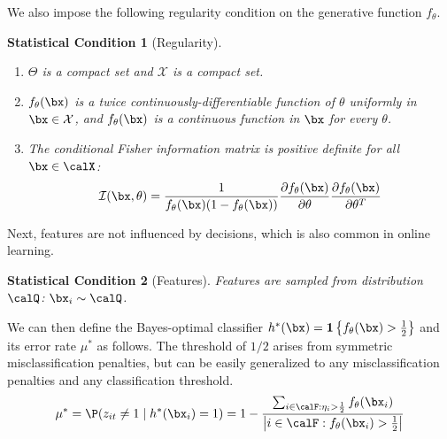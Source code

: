\documentclass[11pt]{article}
\newtheorem{stat}{Statistical Condition}[]
\begin{document}
We also impose the following regularity condition on the generative function $f_\theta$.
\begin{stat}[Regularity]\label{ass:regularity_R1}
\begin{enumerate}
    \item $\Theta$ is a compact set and $\mathcal{X}$ is a compact set.
    \item $f_\theta(\bx)$ is a twice continuously-differentiable function of $\theta$ uniformly in $\bx \in \mathcal{X}$, and $f_\theta(\bx)$ is a continuous function in $\bx$ for every $\theta$. 
    \item The conditional Fisher information matrix is positive definite for all $\bx\in\calX$:
    \[\mathcal{I}(\bx,\theta) = \frac{1}{f_\theta(\bx)(1-f_\theta(\bx))}\frac{\partial f_\theta(\bx)}{\partial \theta}\frac{\partial f_\theta(\bx)}{\partial \theta^T} \]
\end{enumerate}
\end{stat}

Next, features are not influenced by decisions, which is also common in online learning.

\begin{stat}[Features]\label{ass:features_R1}
    Features are sampled from distribution $\calQ$:
    $\bx_{i}\sim \calQ$.
\end{stat}

We can then define the Bayes-optimal classifier $h^*(\bx)=\mathbf{1}\left\{f_\theta(\bx)>\frac{1}{2}\right\}$ and its error rate $\mu^*$ as follows.  The threshold of $1/2$ arises from symmetric misclassification penalties, but can be easily generalized to any misclassification penalties and any classification threshold.
$$\mu^*=\P(z_{it}\neq1 \mid h^*(\bx_i)=1)=1-\frac{\sum_{i\in\calF:\eta_{i}>\frac{1}{2}}f_\theta(\bx_{i})}{\left|i\in\calF:f_\theta(\bx_{i})>\frac{1}{2}\right|}$$
\end{document}
